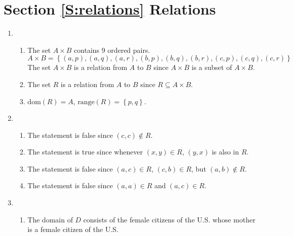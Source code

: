 \section*{Section \ref{S:relations} Relations}

\begin{enumerate}
\item \begin{enumerate}
\item The set  $A \times B$  contains  9  ordered pairs.  
\[
A \times B = \left\{ \left( a, p \right), \left( a, q \right), \left( a, r \right), 
\left( b, p \right), \left( b, q \right), \left( b, r \right), 
\left( c, p \right), \left( c, q \right), \left( c, r \right) \right\}
\]
The set  $A \times B$  is a relation from  $A$  to  $B$  since $A \times B$  is a subset of  $A \times B$.

\item The set  $R$  is a relation from  $A$  to  $B$  since  $R \subseteq A \times B$.

\item $\text{dom}\left( R \right) = A$, $\text{range}\left( R \right) = \left\{ {p, q} \right\}$.

\end{enumerate}



\item \begin{enumerate}
\item The statement is false since $\left( c, c \right) \notin R$.
\item The statement is true since whenever $\left( x, y \right) \in R$, $\left( y, x \right)$ is also in $R$.
\item The statement is false since $\left( a, c \right) \in R$, $\left( c, b \right) \in R$, but 
$\left( a, b \right) \notin R$.
\item The statement is false since $\left( a, a \right) \in R$ and $\left( a, c \right) \in R$.
\end{enumerate}



\item \begin{enumerate}
\item The domain of  $D$  consists of the female citizens of the U.S. whose mother is a female citizen of the U.S.


\end{enumerate}
\end{enumerate}
